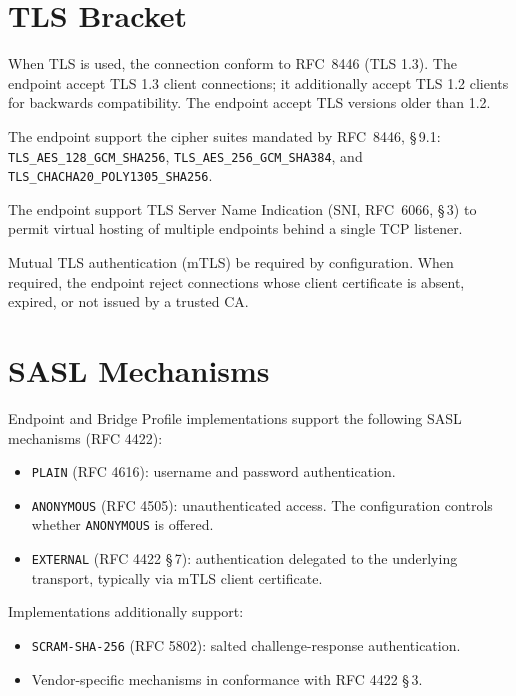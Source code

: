 \documentclass{../styles/zerodds-vendor-spec}
\begin{document}
\section{TLS Bracket}\label{sec:security-tls}

When TLS is used, the connection  conform to
RFC~8446 (TLS 1.3). The endpoint  accept TLS 1.3
client connections; it  additionally accept TLS 1.2
clients for backwards compatibility. The endpoint 
accept TLS versions older than 1.2.

The endpoint  support the cipher suites mandated by
RFC~8446, \S\,9.1: \texttt{TLS\_AES\_128\_GCM\_SHA256},
\texttt{TLS\_AES\_256\_GCM\_SHA384}, and
\texttt{TLS\_CHACHA20\_POLY1305\_SHA256}.

The endpoint  support TLS Server Name Indication (SNI,
RFC~6066, \S\,3) to permit virtual hosting of multiple endpoints
behind a single TCP listener.

Mutual TLS authentication (mTLS)  be required by
configuration. When required, the endpoint  reject
connections whose client certificate is absent, expired, or not
issued by a trusted CA.

\section{SASL Mechanisms}\label{sec:security-sasl}

Endpoint and Bridge Profile implementations  support
the following SASL mechanisms (RFC 4422):

\begin{itemize}
  \item \texttt{PLAIN} (RFC 4616): username and password
        authentication.
  \item \texttt{ANONYMOUS} (RFC 4505): unauthenticated access. The
        configuration controls whether \texttt{ANONYMOUS} is
        offered.
  \item \texttt{EXTERNAL} (RFC 4422 \S\,7): authentication
        delegated to the underlying transport, typically via mTLS
        client certificate.
\end{itemize}

Implementations  additionally support:

\begin{itemize}
  \item \texttt{SCRAM-SHA-256} (RFC 5802): salted challenge-response
        authentication.
  \item Vendor-specific mechanisms in conformance with RFC 4422
        \S\,3.
\end{itemize}
\end{document}
